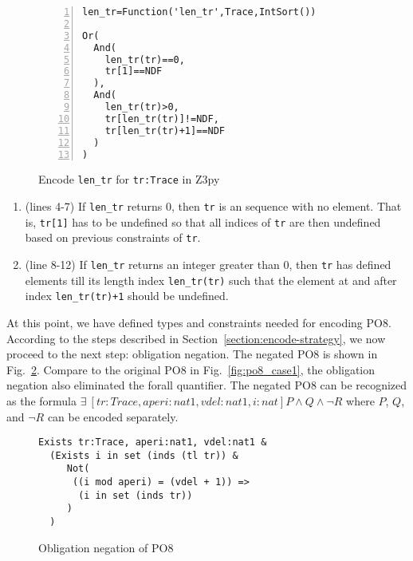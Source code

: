 \begin{figure}[t]
\begin{center}
\begin{mdframed}[roundcorner=5pt,shadow=true]
\begin{Verbatim}[fontsize=\small,numbers=left]
len_tr=Function('len_tr',Trace,IntSort())

Or(
  And(
    len_tr(tr)==0,
    tr[1]==NDF
  ),
  And(
    len_tr(tr)>0,
    tr[len_tr(tr)]!=NDF,
    tr[len_tr(tr)+1]==NDF
  )
)
\end{Verbatim}
\end{mdframed}
\vspace{-10pt}
\caption{Encode {\tt len\_tr} for {\tt tr:Trace} in Z3py}
\label{fig:tr_len_case1}
\end{center}
\end{figure}

\begin{enumerate}
\item
(lines 4-7) If {\tt len\_tr} returns 0, then {\tt tr} is an sequence with no element. That is, {\tt tr[1]} has to be undefined so that all indices of {\tt tr} are then undefined based on previous constraints of {\tt tr}. 
\item
(line 8-12) If {\tt len\_tr} returns an integer greater than 0, then {\tt tr} has defined elements till its length index {\tt len\_tr(tr)} such that the element at and after index {\tt len\_tr(tr)+1} should be undefined. 
\end{enumerate}

At this point, we have defined types and constraints needed for encoding PO8. According to the steps described in Section~\ref{section:encode-strategy}, we now proceed to the next step: obligation negation. The negated PO8 is shown in Fig.~\ref{fig:po8_negation_case1}. Compare to the original PO8 in Fig.~\ref{fig:po8_case1}, the obligation negation also eliminated the forall quantifier. The negated PO8 can be recognized as the formula $\exists~[tr:Trace,aperi:nat1,vdel:nat1,i:nat] P \land Q \land \neg R$ where $P$, $Q$, and $\neg R$ can be encoded separately.

\begin{figure}[t]
\begin{center}
\begin{mdframed}[roundcorner=5pt]
\begin{Verbatim}[fontsize=\small]
Exists tr:Trace, aperi:nat1, vdel:nat1 &
  (Exists i in set (inds (tl tr)) &
     Not(
      ((i mod aperi) = (vdel + 1)) =>
       (i in set (inds tr))
     )
  )
\end{Verbatim}
\end{mdframed}
\vspace{-10pt}
\caption{Obligation negation of PO8}
\label{fig:po8_negation_case1}
\end{center}
\vspace{-20pt}
\end{figure}


